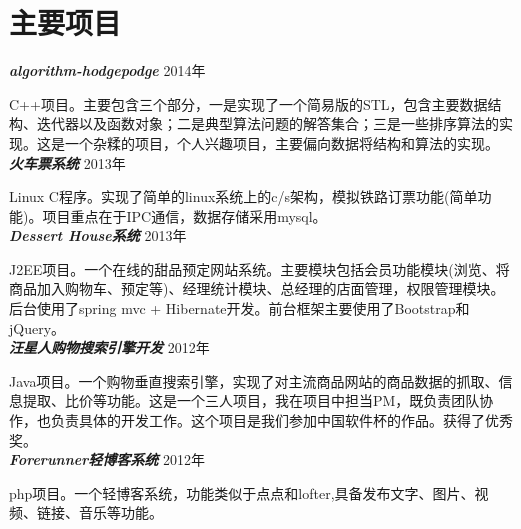 \documentclass[10pt]{article} %
\begin{document}
\begin{minipage}[t]{0.6\textwidth}

\section{主要项目}

{\bf \large \textit{algorithm-hodgepodge}} \hfill  \hfill {2014年\\}

\normalsize{C++项目。主要包含三个部分，一是实现了一个简易版的STL，包含主要数据结构、迭代器以及函数对象；二是典型算法问题的解答集合；三是一些排序算法的实现。这是一个杂糅的项目，个人兴趣项目，主要偏向数据将结构和算法的实现。}\\

{\bf \large \textit{火车票系统}} \hfill  \hfill {2013年\\}

\normalsize{Linux C程序。实现了简单的linux系统上的c/s架构，模拟铁路订票功能(简单功能)。项目重点在于IPC通信，数据存储采用mysql。}\\


{\bf \large \textit{Dessert House系统}} \hfill  \hfill {2013年\\}

\normalsize{J2EE项目。一个在线的甜品预定网站系统。主要模块包括会员功能模块(浏览、将商品加入购物车、预定等)、经理统计模块、总经理的店面管理，权限管理模块。后台使用了spring mvc + Hibernate开发。前台框架主要使用了Bootstrap和jQuery。}\\

{\bf \large \textit{汪星人购物搜索引擎开发}} \hfill  \hfill {2012年\\}

\normalsize{Java项目。一个购物垂直搜索引擎，实现了对主流商品网站的商品数据的抓取、信息提取、比价等功能。这是一个三人项目，我在项目中担当PM，既负责团队协作，也负责具体的开发工作。这个项目是我们参加中国软件杯的作品。获得了优秀奖。}\\

{\bf \large \textit{Forerunner轻博客系统}} \hfill  \hfill {2012年\\}

\normalsize{php项目。一个轻博客系统，功能类似于点点和lofter,具备发布文字、图片、视频、链接、音乐等功能。}\\


\end{minipage} %
\end{document}
